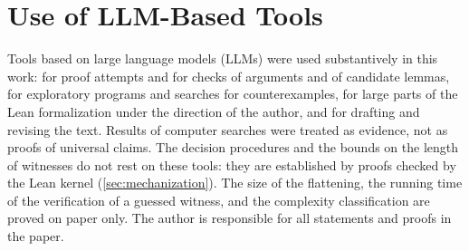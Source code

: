 \section*{Use of LLM-Based Tools}
Tools based on large language models (LLMs) were used substantively in this work: for proof
attempts and for checks of arguments and of candidate lemmas, for exploratory programs and
searches for counterexamples, for large parts of the Lean formalization under the direction
of the author, and for drafting and revising the text. Results of computer searches were
treated as evidence, not as proofs of universal claims. The decision procedures and the
bounds on the length of witnesses do not rest on these tools: they are established by proofs
checked by the Lean kernel (\cref{sec:mechanization}). The size of the flattening, the
running time of the verification of a guessed witness, and the complexity classification are
proved on paper only. The author is responsible for all statements and proofs in the paper.
